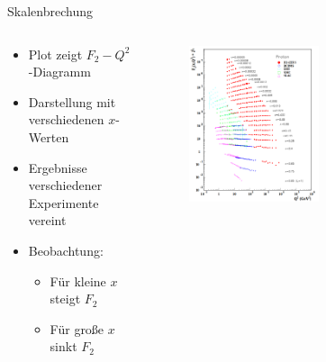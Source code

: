 \documentclass[aspectratio=1610, 9pt]{beamer}
\begin{document}
\begin{frame}{Skalenbrechung}
  \begin{columns}
    \begin{column}{0.3\textwidth}
        \begin{itemize}
          \item{Plot zeigt $F_2-Q^2$-Diagramm}
          \item{Darstellung mit verschiedenen $x$-Werten}
          \item{Ergebnisse verschiedener Experimente vereint}
          \item{Beobachtung:}
          \begin{itemize}
            \item{Für kleine $x$ steigt $F_2$}
            \item{Für große $x$ sinkt $F_2$}
          \end{itemize}
        \end{itemize}
    \end{column}

    \begin{column}{0.7\textwidth}
      \begin{figure}
        \centering
        \includegraphics[width=0.55\textwidth]{images/Skalen.png}
      \end{figure}
    \end{column}
  \end{columns}
\end{frame}
\end{document}
